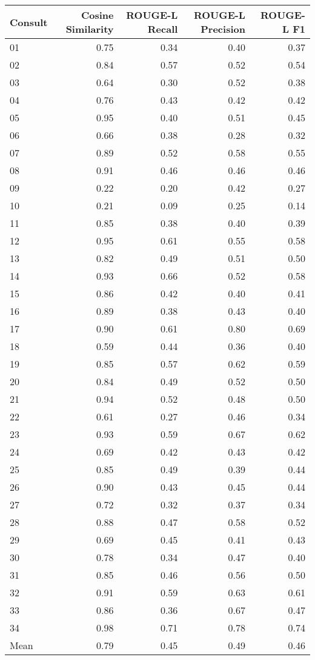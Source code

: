 \begin{tabular}{lrrrr}
\toprule
Consult & Cosine Similarity & ROUGE-L Recall & ROUGE-L Precision & ROUGE-L F1 \\
\midrule
01 & 0.75 & 0.34 & 0.40 & 0.37 \\
02 & 0.84 & 0.57 & 0.52 & 0.54 \\
03 & 0.64 & 0.30 & 0.52 & 0.38 \\
04 & 0.76 & 0.43 & 0.42 & 0.42 \\
05 & 0.95 & 0.40 & 0.51 & 0.45 \\
06 & 0.66 & 0.38 & 0.28 & 0.32 \\
07 & 0.89 & 0.52 & 0.58 & 0.55 \\
08 & 0.91 & 0.46 & 0.46 & 0.46 \\
09 & 0.22 & 0.20 & 0.42 & 0.27 \\
10 & 0.21 & 0.09 & 0.25 & 0.14 \\
11 & 0.85 & 0.38 & 0.40 & 0.39 \\
12 & 0.95 & 0.61 & 0.55 & 0.58 \\
13 & 0.82 & 0.49 & 0.51 & 0.50 \\
14 & 0.93 & 0.66 & 0.52 & 0.58 \\
15 & 0.86 & 0.42 & 0.40 & 0.41 \\
16 & 0.89 & 0.38 & 0.43 & 0.40 \\
17 & 0.90 & 0.61 & 0.80 & 0.69 \\
18 & 0.59 & 0.44 & 0.36 & 0.40 \\
19 & 0.85 & 0.57 & 0.62 & 0.59 \\
20 & 0.84 & 0.49 & 0.52 & 0.50 \\
21 & 0.94 & 0.52 & 0.48 & 0.50 \\
22 & 0.61 & 0.27 & 0.46 & 0.34 \\
23 & 0.93 & 0.59 & 0.67 & 0.62 \\
24 & 0.69 & 0.42 & 0.43 & 0.42 \\
25 & 0.85 & 0.49 & 0.39 & 0.44 \\
26 & 0.90 & 0.43 & 0.45 & 0.44 \\
27 & 0.72 & 0.32 & 0.37 & 0.34 \\
28 & 0.88 & 0.47 & 0.58 & 0.52 \\
29 & 0.69 & 0.45 & 0.41 & 0.43 \\
30 & 0.78 & 0.34 & 0.47 & 0.40 \\
31 & 0.85 & 0.46 & 0.56 & 0.50 \\
32 & 0.91 & 0.59 & 0.63 & 0.61 \\
33 & 0.86 & 0.36 & 0.67 & 0.47 \\
34 & 0.98 & 0.71 & 0.78 & 0.74 \\
Mean & 0.79 & 0.45 & 0.49 & 0.46 \\
\bottomrule
\end{tabular}
